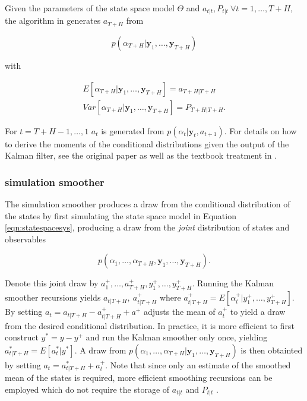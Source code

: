 \documentclass[notitlepage,a4paper,12pt]{article}
\begin{document}
Given the parameters of the state space model $\Theta$ and  $a_{t|t}, P_{t|t} \: \forall t = 1, \dots, T+H$, the algorithm in \citet{carterkohn1994_biomtr} generates $a_{T+H}$ from 

$$
p(\alpha_{T+H}|\mathbf{y}_1, \dots, \mathbf{y}_{T+H})
$$

\noindent with

\begin{align*}
    E[\alpha_{T+H}|\mathbf{y}_1, \dots, \mathbf{y}_{T+H}] = a_{T+H|T+H} \\
    Var[\alpha_{T+H}|\mathbf{y}_1, \dots, \mathbf{y}_{T+H}] = P_{T+H|T+H}.
\end{align*}

 For $t=T+H-1, \dots, 1$ $a_t$ is generated from $p(\alpha_{t}|\mathbf{y}_t, a_{t+1})$. For details on how to derive the moments of the conditional distributions given the output of the Kalman filter, see the original paper as well as the textbook treatment in \citet{KimNelson1999mit}.

 \subsubsection{\citet{durbinkoopman2002_biomtr} simulation smoother}

The \citet{durbinkoopman2002_biomtr} simulation smoother produces a draw from the conditional distribution of the states by first simulating the state space model in Equation \ref{eqn:statespacesys}, producing a draw from the \textit{joint} distribution of states and observables

$$p(\alpha_{1}, \dots, \alpha_{T+H}, \mathbf{y}_1, \dots, \mathbf{y}_{T+H}).$$

Denote this joint draw by $a^+_1, \dots, a^+_{T+H}, y^+_1, \dots, y^+_{T+H}$. Running the Kalman smoother recursions yields $a_{t|T+H}, \: a^+_{t|T+H}$ where $a^+_{t|T+H} = E[\alpha^+_t|y^+_1, \dots, y^+_{T+H}]$.  By setting $a_t = a_{t|T+H} - a^+_{t|T+H} + a^+$ adjusts the mean of $a^+_t$ to yield a draw from the desired conditional distribution. In practice, it is more efficient to first construct $y^* = y-y^+$ and run the Kalman smoother only once, yielding $a^*_{t|T+H} = E[a^*_t|y^*]$. A draw from $p(\alpha_{1}, \dots, \alpha_{T+H}|\mathbf{y}_1, \dots, \mathbf{y}_{T+H})$ is then obtainted by setting $a_t = a^*_{t|T+H} + a^+_t$. Note that since only an estimate of the smoothed mean of the states is required, more efficient smoothing recursions can be employed which do not require the storage of $a_{t|t}$ and $P_{t|t}$ \citep[see][ch. 4.4.2]{durbinkoopman2002_biomtr}.
\end{document}
